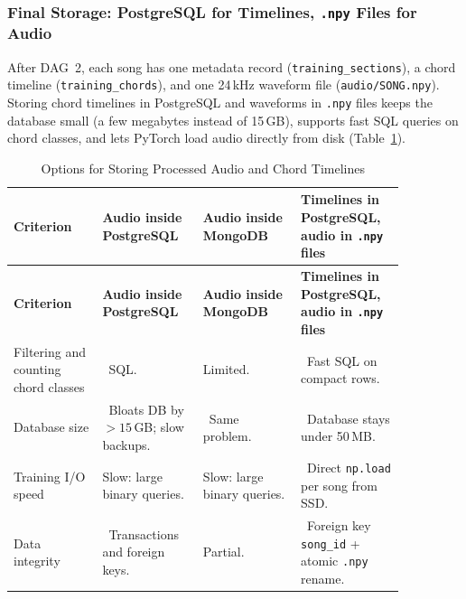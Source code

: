 \documentclass[a4paper]{article}
\newcommand{\cmark}{\ding{51}}
\newcommand{\xmark}{\ding{55}}
\begin{document}
\subsubsection{Final Storage: PostgreSQL for Timelines, \texttt{.npy} Files for Audio}

After DAG~2, each song has one metadata record (\texttt{training\_sections}), a chord timeline (\texttt{training\_chords}), and one 24\,kHz waveform file (\texttt{audio/SONG.npy}). Storing chord timelines in PostgreSQL and waveforms in \texttt{.npy} files keeps the database small (a few megabytes instead of 15\,GB), supports fast SQL queries on chord classes, and lets PyTorch load audio directly from disk (Table~\ref{tab:db_final}).

\begin{longtable}{@{}
    >{\raggedright\arraybackslash}p{0.20\linewidth}
    >{\raggedright\arraybackslash}p{0.22\linewidth}
    >{\raggedright\arraybackslash}p{0.22\linewidth}
    >{\raggedright\arraybackslash}p{0.22\linewidth}@{}}

    \caption{Options for Storing Processed Audio and Chord Timelines}\label{tab:db_final} \\
    \toprule
    \textbf{Criterion} & \textbf{Audio inside PostgreSQL} & \textbf{Audio inside MongoDB} & \textbf{Timelines in PostgreSQL, audio in \texttt{.npy} files} \\
    \midrule
    \endfirsthead
    \toprule
    \textbf{Criterion} & \textbf{Audio inside PostgreSQL} & \textbf{Audio inside MongoDB} & \textbf{Timelines in PostgreSQL, audio in \texttt{.npy} files} \\
    \midrule
    \endhead
    \bottomrule
    \endlastfoot

    Filtering and counting chord classes &
    \cmark~SQL. &
    Limited. &
    \cmark~Fast SQL on compact rows. \\
    \addlinespace
    Database size &
    \xmark~Bloats DB by $>15$\,GB; slow backups. &
    \xmark~Same problem. &
    \cmark~Database stays under 50\,MB. \\
    \addlinespace
    Training I/O speed &
    Slow: large binary queries. &
    Slow: large binary queries. &
    \cmark~Direct \texttt{np.load} per song from SSD. \\
    \addlinespace
    Data integrity &
    \cmark~Transactions and foreign keys. &
    Partial. &
    \cmark~Foreign key \texttt{song\_id} + atomic \texttt{.npy} rename. \\
\end{longtable}
\end{document}
